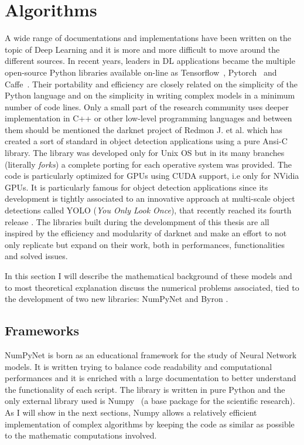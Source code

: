\documentclass[12pt,a4paper]{report}
\begin{document}
\chapter{Algorithms}

A wide range of documentations and implementations have been written on the topic of Deep Learning and it is more and more difficult to move around the different sources.
In recent years, leaders in DL applications became the multiple open-source \textsf{Python} libraries available on-line as \textsf{Tensorflow}~\cite{tensorflow2015-whitepaper}, \textsf{Pytorch}~\cite{paszke2017automatic} and \textsf{Caffe}~\cite{Jia:2014:Caffe}.
Their portability and efficiency are closely related on the simplicity of the \textsf{Python} language and on the simplicity in writing complex models in a minimum number of code lines.
Only a small part of the research community uses deeper implementation in \textsf{C++} or other low-level programming languages and between them should be mentioned the \textsf{darknet project} of Redmon J. et al. which has created a sort of standard in object detection applications using a pure \textsf{Ansi-C} library.
The library was developed only for Unix OS but in its many branches (literally \emph{forks}) a complete porting for each operative system was provided.
The code is particularly optimized for GPUs using CUDA support, i.e only for NVidia GPUs.
It is particularly famous for object detection applications since its development is tightly associated to an innovative approach at multi-scale object detections called YOLO (\emph{You Only Look Once}), that recently reached its fourth release \cite{yolov4}.
The libraries built during the develompment of this thesis are all inspired by the efficiency and modularity of darknet and make an effort to not only replicate but expand on their work, both in performances, functionalities and solved issues.

In this section I will describe the mathematical background of these models and 
to most theoretical explanation  discuss the numerical problems associated, tied to the development of two new libraries: \textsf{NumPyNet} \cite{NumPyNet} and \textsf{Byron} \cite{Byron}.

\section{Frameworks}

\textsf{NumPyNet} is born as an educational framework for the study of Neural Network models.
It is written trying to balance code readability and computational performances and it is enriched with a large documentation to better understand the functionality of each script.
The library is written in pure \textsf{Python} and the only external library used is \textsf{Numpy}~\cite{Numpy} (a base package for the scientific research).
As I will show in the next sections, \textsf{Numpy} allows a relatively efficient implementation of complex algorithms by keeping the code as similar as possible to the mathematic computations involved.
\end{document}
